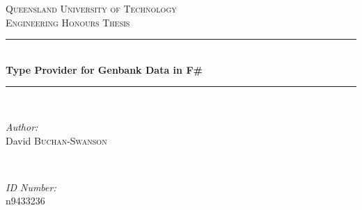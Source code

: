 
\begin{titlepage}

\newcommand{\HRule}{\rule{\linewidth}{0.5mm}} %

\centering %


\textsc{\LARGE Queensland University of Technology}\\[1cm] %
\textsc{\Large Engineering Honours Thesis}\\[0.5cm] %


\HRule \\[0.4cm]
{ \huge \bfseries Type Provider for Genbank Data in F\#}\\[0.2cm] %
\HRule \\[.5cm]


\begin{minipage}{0.45\textwidth}
\begin{flushleft} \large
\emph{Author:}\\
David \textsc{Buchan-Swanson}\\
\end{flushleft}
\end{minipage}
~
\begin{minipage}{0.45\textwidth}
\begin{flushright} \large
\emph{ID Number:}\\
n9433236\\
\end{flushright}
\end{minipage}\\[1.5cm]


\end{titlepage}
